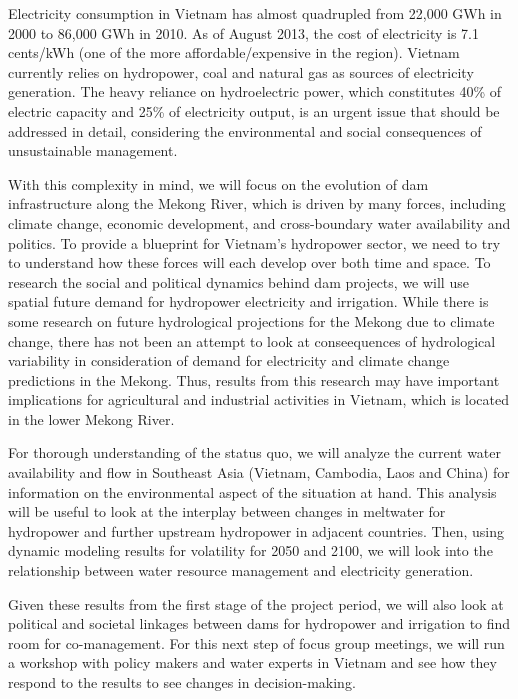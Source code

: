 \documentclass[11pt,english]{article}
\theoremstyle{plain} \newtheorem{claim}{Claim}
\theoremstyle{plain} \newtheorem{prop}{Proposition}
\theoremstyle{plain} \newtheorem{hypo}{Hypothesis}
\begin{document}
	Electricity consumption in Vietnam has almost quadrupled from 22,000 GWh in 2000 to 86,000 GWh in 2010. As of August 2013, the cost of electricity is 7.1 cents/kWh (one of the more affordable/expensive in the region). Vietnam currently relies on hydropower, coal and natural gas as sources of electricity generation. The heavy reliance on hydroelectric power, which constitutes 40\% of electric capacity and 25\% of electricity output, is an urgent issue that should be addressed in detail, considering the environmental and social consequences of unsustainable management. 

	With this complexity in mind, we will focus on the evolution of dam infrastructure along the Mekong River, which is driven by many forces, including climate change, economic development, and cross-boundary water availability and politics. To provide a blueprint for Vietnam's hydropower sector, we need to try to understand how these forces will each develop over both time and space. To research the social and political dynamics behind dam projects, we will use spatial future demand for hydropower electricity and irrigation. While there is some research on future hydrological projections for the Mekong due to climate change, there has not been an attempt to look at conseequences of hydrological variability in consideration of demand for electricity and climate change predictions in the Mekong. Thus, results from this research may have important implications for agricultural and industrial activities in Vietnam, which is located in the lower Mekong River. 
	
	For thorough understanding of the status quo, we will analyze the current water availability and flow in Southeast Asia (Vietnam, Cambodia, Laos and China) for information on the environmental aspect of the situation at hand. This analysis will be useful to look at the interplay between changes in meltwater for hydropower and further upstream hydropower in adjacent countries. Then, using dynamic modeling results for volatility for 2050 and 2100, we will look into the relationship between water resource management and electricity generation. 

	Given these results from the first stage of the project period, we will also look at political and societal linkages between dams for hydropower and irrigation to find room for co-management. For this next step of focus group meetings, we will run a workshop with policy makers and water experts in Vietnam and see how they respond to the results to see changes in decision-making. 
	
\end{document}
